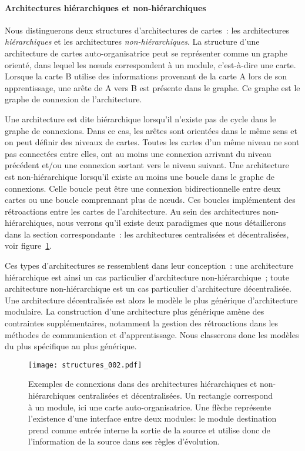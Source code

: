 \documentclass[../main]{subfiles}
\begin{document}
\paragraph{Architectures hiérarchiques et non-hiérarchiques}

Nous distinguerons deux structures d'architectures de cartes~: les architectures \emph{hiérarchiques} et les architectures \emph{non-hiérarchiques}.
La structure d'une architecture de cartes auto-organisatrice peut se représenter comme un graphe orienté, dans lequel les n\oe{}uds correspondent à un module, c'est-à-dire une carte. Lorsque la carte B utilise des informations provenant de la carte A lors de son apprentissage, une arête de A vers B est présente dans le graphe. Ce graphe est le graphe de connexion de l'architecture.

Une architecture est dite hiérarchique lorsqu'il n'existe pas de cycle dans le graphe de connexions. Dans ce cas, les arêtes sont orientées dans le même sens et on peut définir des niveaux de cartes. Toutes les cartes d'un même niveau ne sont pas connectées entre elles, ont au moins une connexion arrivant du niveau précédent et/ou une connexion sortant vers le niveau suivant.
Une architecture est non-hiérarchique lorsqu'il existe au moins une boucle dans le graphe de connexions. Celle boucle peut être une connexion bidirectionnelle entre deux cartes ou une boucle comprennant plus de n\oe{}uds. Ces boucles implémentent des rétroactions entre les cartes de l'architecture.
Au sein des architectures non-hiérarchiques, nous verrons qu'il existe deux paradigmes que nous détaillerons dans la section correspondante~: les architectures centralisées et décentralisées, voir figure~\ref{fig:structure}.


Ces types d'architectures se ressemblent dans leur conception~: une architecture hiérarchique est ainsi un cas particulier d'architecture non-hiérarchique~; toute architecture non-hiérarchique est un cas particulier d'architecture décentralisée. Une architecture décentralisée est alors le modèle le plus générique d'architecture modulaire.
La construction d'une architecture plus générique amène des contraintes supplémentaires, notamment la gestion des rétroactions dans les méthodes de communication et d'apprentissage.
Nous classerons donc les modèles du plus spécifique au plus générique.
\begin{figure}
    \centering\texttt{[image: structures\_002.pdf]}
    \caption{Exemples de connexions dans des architectures hiérarchiques et non-hiérarchiques centralisées et décentralisées. Un rectangle correspond à un module, ici une carte auto-organisatrice. Une flèche représente l'existence d'une interface entre deux modules: le module destination prend comme entrée interne la sortie de la source et utilise donc de l'information de la source dans ses règles d'évolution. \label{fig:structure}}
    \end{figure}
\end{document}
